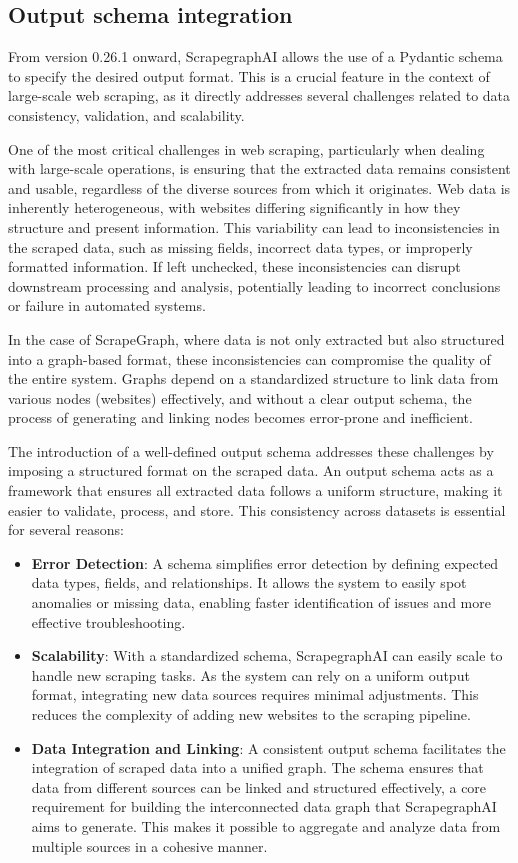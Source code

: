 \subsection{Output schema integration}
From version 0.26.1 onward, ScrapegraphAI allows the use of a Pydantic schema to specify the desired output format. This is a crucial feature in the context of large-scale web scraping, as it directly addresses several challenges related to data consistency, validation, and scalability.

One of the most critical challenges in web scraping, particularly when dealing with large-scale operations, is ensuring that the extracted data remains consistent and usable, regardless of the diverse sources from which it originates. Web data is inherently heterogeneous, with websites differing significantly in how they structure and present information. This variability can lead to inconsistencies in the scraped data, such as missing fields, incorrect data types, or improperly formatted information. If left unchecked, these inconsistencies can disrupt downstream processing and analysis, potentially leading to incorrect conclusions or failure in automated systems.

In the case of ScrapeGraph, where data is not only extracted but also structured into a graph-based format, these inconsistencies can compromise the quality of the entire system. Graphs depend on a standardized structure to link data from various nodes (websites) effectively, and without a clear output schema, the process of generating and linking nodes becomes error-prone and inefficient.

The introduction of a well-defined output schema addresses these challenges by imposing a structured format on the scraped data. An output schema acts as a framework that ensures all extracted data follows a uniform structure, making it easier to validate, process, and store. This consistency across datasets is essential for several reasons:

\begin{itemize}
    \item \textbf{Error Detection}: A schema simplifies error detection by defining expected data types, fields, and relationships. It allows the system to easily spot anomalies or missing data, enabling faster identification of issues and more effective troubleshooting.
    \item \textbf{Scalability}: With a standardized schema, ScrapegraphAI can easily scale to handle new scraping tasks. As the system can rely on a uniform output format, integrating new data sources requires minimal adjustments. This reduces the complexity of adding new websites to the scraping pipeline.
    \item \textbf{Data Integration and Linking}: A consistent output schema facilitates the integration of scraped data into a unified graph. The schema ensures that data from different sources can be linked and structured effectively, a core requirement for building the interconnected data graph that ScrapegraphAI aims to generate. This makes it possible to aggregate and analyze data from multiple sources in a cohesive manner.
\end{itemize}

